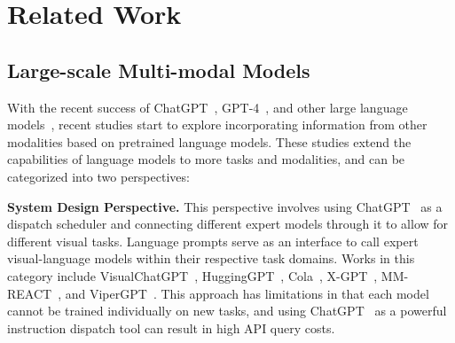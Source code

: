 \documentclass{article}
\begin{document}
 \section{Related Work}
\subsection{Large-scale Multi-modal Models}
With the recent success of ChatGPT~\cite{chatgpt}, GPT-4~\cite{gpt4}, and other large language models~\cite{llama,alpaca,vicuna2023}, recent studies start to explore incorporating information from other modalities based on pretrained language models. These studies extend the capabilities of language models to more tasks and modalities, and can be categorized into two perspectives:

\textbf{System Design Perspective.} This perspective involves using ChatGPT~\cite{chatgpt} as a dispatch scheduler and connecting different expert models through it to allow for different visual tasks. Language prompts serve as an interface to call expert visual-language models within their respective task domains. Works in this category include VisualChatGPT~\cite{visual_chat_gpt}, HuggingGPT~\cite{hugginggpt}, Cola~\cite{cola}, X-GPT~\cite{zou2022generalized}, MM-REACT~\cite{yang2023mm}, and ViperGPT~\cite{suris2023vipergpt}. This approach has limitations in that each model cannot be trained individually on new tasks, and using ChatGPT~\cite{chatgpt} as a powerful instruction dispatch tool can result in high API query costs.
\end{document}
